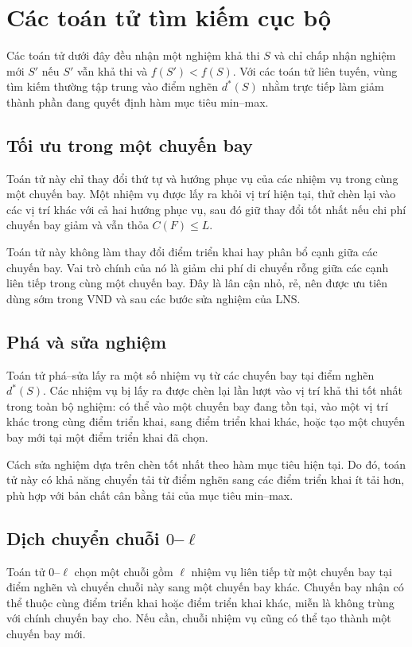 \section{Các toán tử tìm kiếm cục bộ}

Các toán tử dưới đây đều nhận một nghiệm khả thi \(S\) và chỉ chấp nhận nghiệm mới \(S'\) nếu \(S'\) vẫn khả thi và \(f(S')<f(S)\). Với các toán tử liên tuyến, vùng tìm kiếm thường tập trung vào điểm nghẽn \(d^*(S)\) nhằm trực tiếp làm giảm thành phần đang quyết định hàm mục tiêu min--max.

\subsection{Tối ưu trong một chuyến bay}

Toán tử này chỉ thay đổi thứ tự và hướng phục vụ của các nhiệm vụ trong cùng một chuyến bay. Một nhiệm vụ được lấy ra khỏi vị trí hiện tại, thử chèn lại vào các vị trí khác với cả hai hướng phục vụ, sau đó giữ thay đổi tốt nhất nếu chi phí chuyến bay giảm và vẫn thỏa \(C(F)\leq L\).

Toán tử này không làm thay đổi điểm triển khai hay phân bổ cạnh giữa các chuyến bay. Vai trò chính của nó là giảm chi phí di chuyển rỗng giữa các cạnh liên tiếp trong cùng một chuyến bay. Đây là lân cận nhỏ, rẻ, nên được ưu tiên dùng sớm trong VND và sau các bước sửa nghiệm của LNS.

\subsection{Phá và sửa nghiệm}

Toán tử phá--sửa lấy ra một số nhiệm vụ từ các chuyến bay tại điểm nghẽn \(d^*(S)\). Các nhiệm vụ bị lấy ra được chèn lại lần lượt vào vị trí khả thi tốt nhất trong toàn bộ nghiệm: có thể vào một chuyến bay đang tồn tại, vào một vị trí khác trong cùng điểm triển khai, sang điểm triển khai khác, hoặc tạo một chuyến bay mới tại một điểm triển khai đã chọn.

Cách sửa nghiệm dựa trên chèn tốt nhất theo hàm mục tiêu hiện tại. Do đó, toán tử này có khả năng chuyển tải từ điểm nghẽn sang các điểm triển khai ít tải hơn, phù hợp với bản chất cân bằng tải của mục tiêu min--max.

\subsection{Dịch chuyển chuỗi \(0\)--\(\ell\)}

Toán tử \(0\)--\(\ell\) chọn một chuỗi gồm \(\ell\) nhiệm vụ liên tiếp từ một chuyến bay tại điểm nghẽn và chuyển chuỗi này sang một chuyến bay khác. Chuyến bay nhận có thể thuộc cùng điểm triển khai hoặc điểm triển khai khác, miễn là không trùng với chính chuyến bay cho. Nếu cần, chuỗi nhiệm vụ cũng có thể tạo thành một chuyến bay mới.

